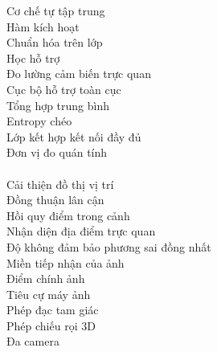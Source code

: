 \begin{keyword}
                    {Cơ chế tự tập trung}           \\
               {Hàm kích hoạt}                 \\
               {Chuẩn hóa trên lớp}            \\
                {Học hỗ trợ}                    \\
                   {Đo lường cảm biến trực quan}   \\
              {Cục bộ hỗ trợ toàn cục}        \\
                   {Tổng hợp trung bình}           \\
                     {Entropy chéo}                  \\
      {Lớp kết hợp kết nối đầy đủ}    \\
         {Đơn vị đo quán tính}           \\
      \\
           {Cải thiện đồ thị vị trí}       \\
            {Đồng thuận lân cận}	 		\\ 
            {Hồi quy điểm trong cảnh} 		\\
          {Nhận diện địa điểm trực quan} 	\\
         {Độ không đảm bảo phương sai đồng nhất} \\
                   {Miền tiếp nhận của ảnh}		\\
                   {Điểm chính ảnh}                \\
                      {Tiêu cự máy ảnh}               \\
                     {Phép đạc tam giác}             \\
                  {Phép chiếu rọi 3D}             \\
                     {Đa camera}                     \\
\end{keyword}

